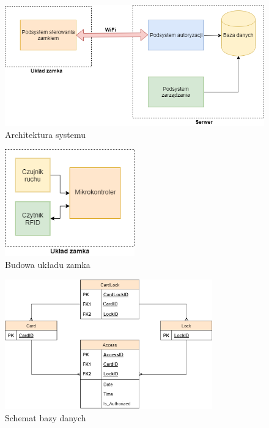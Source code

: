             \vspace{10mm}
            \begin{figure}[]
                \includegraphics[width=\linewidth]{chapters/images/hl-arch3.png}
                \caption{Architektura systemu}
                \label{fig:hl-arch}
            \end{figure}

            \begin{figure}[]
                \centering
                \includegraphics[width=0.5\textwidth]{chapters/images/lock.png}
                \caption{Budowa układu zamka}
                \label{fig:lock-arch}
            \end{figure}
            \vspace{10mm}
            \begin{figure}[]
                \centering
                \includegraphics[width=0.8\textwidth]{chapters/images/schema.png}
                \caption{Schemat bazy danych}
                \label{fig:db}
            \end{figure}


